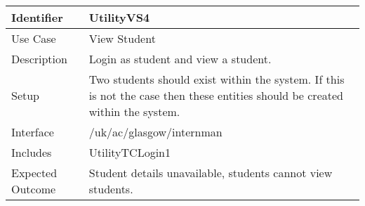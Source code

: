\vspace{2em}
\begin{tabularx}{\textwidth}{|T|L|}
\hline
Identifier & UtilityVS4\\
\hline
Use Case & View Student \\
\hline 
Description & Login as student and view a student.\\
\hline
Setup & Two students should exist within the system. If this is not
the case then these entities should be created within the system. \\
\hline
Interface & /uk/ac/glasgow/internman \\
\hline
Includes & UtilityTCLogin1\\
\hline
Expected Outcome & Student details unavailable, students cannot view
students.\\
\hline
\end{tabularx}

\vspace{2em}
